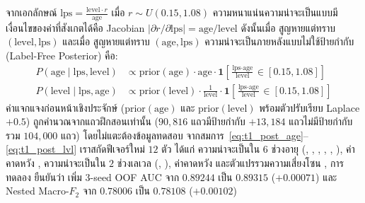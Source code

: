 จากเอกลักษณ์ $\mathrm{lps} = \frac{\mathrm{level} \cdot r}{\mathrm{age}}$ เมื่อ $r \sim U(0.15, 1.08)$ ความหนาแน่นความน่าจะเป็นแบบมีเงื่อนไขของค่าที่สังเกตได้คือ Jacobian $|\partial r / \partial \mathrm{lps}| = \mathrm{age}/\mathrm{level}$ ดังนั้นเมื่อ  สูญหายแต่ทราบ $(\mathrm{level}, \mathrm{lps})$ และเมื่อ  สูญหายแต่ทราบ $(\mathrm{age}, \mathrm{lps})$ ความน่าจะเป็นภายหลังแบบไม่ใช้ป้ายกำกับ (Label-Free Posterior) คือ:
\begin{align}
P(\text{age} \mid \text{lps}, \text{level}) &\propto \text{prior}(\text{age}) \cdot \text{age} \cdot \mathbf{1}\!\left[\frac{\text{lps}\cdot\text{age}}{\text{level}} \in [0.15, 1.08]\right] \label{eq:t1_post_age}\\
P(\text{level} \mid \text{lps}, \text{age}) &\propto \text{prior}(\text{level}) \cdot \frac{1}{\text{level}} \cdot \mathbf{1}\!\left[\frac{\text{lps}\cdot\text{age}}{\text{level}} \in [0.15, 1.08]\right] \label{eq:t1_post_lvl}
\end{align}
ค่าแจกแจงก่อนหน้าเชิงประจักษ์ ($\text{prior}(\text{age})$ และ $\text{prior}(\text{level})$ พร้อมตัวปรับเรียบ Laplace $+0.5$) ถูกคำนวณจากแถวฝึกสอนเท่านั้น ($90,816$ แถวมีป้ายกำกับ $+ 13,184$ แถวไม่มีป้ายกำกับ รวม $104,000$ แถว) โดยไม่แตะต้องข้อมูลทดสอบ จากสมการ~\eqref{eq:t1_post_age}--\eqref{eq:t1_post_lvl} เราสกัดฟีเจอร์ใหม่ $12$ ตัว ได้แก่ ความน่าจะเป็นใน $6$ ช่วงอายุ (, , , , , ), ค่าคาดหวัง , ความน่าจะเป็นใน $2$ ช่วงเลเวล (, ), ค่าคาดหวัง  และตัวแปรรวมความเสี่ยงโซน ,  การทดลอง  ยืนยันว่า  เพิ่ม 3-seed OOF AUC จาก $0.89244$ เป็น $0.89315$ ($+0.00071$) และ Nested Macro-$F_2$ จาก $0.78006$ เป็น $0.78108$ ($+0.00102$)

